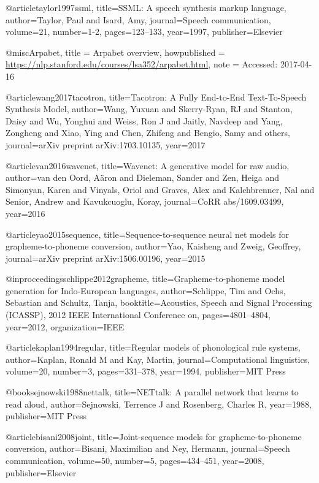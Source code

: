 @article{taylor1997ssml,
  title={SSML: A speech synthesis markup language},
  author={Taylor, Paul and Isard, Amy},
  journal={Speech communication},
  volume={21},
  number={1-2},
  pages={123--133},
  year={1997},
  publisher={Elsevier}
}

@misc{Arpabet,
  title = {Arpabet overview},
  howpublished = {\url{https://nlp.stanford.edu/courses/lsa352/arpabet.html}},
  note = {Accessed: 2017-04-16}
}

@article{wang2017tacotron,
  title={Tacotron: A Fully End-to-End Text-To-Speech Synthesis Model},
  author={Wang, Yuxuan and Skerry-Ryan, RJ and Stanton, Daisy and Wu, Yonghui and Weiss, Ron J and Jaitly, Navdeep and Yang, Zongheng and Xiao, Ying and Chen, Zhifeng and Bengio, Samy and others},
  journal={arXiv preprint arXiv:1703.10135},
  year={2017}
}

@article{van2016wavenet,
  title={Wavenet: A generative model for raw audio},
  author={van den Oord, A{\"a}ron and Dieleman, Sander and Zen, Heiga and Simonyan, Karen and Vinyals, Oriol and Graves, Alex and Kalchbrenner, Nal and Senior, Andrew and Kavukcuoglu, Koray},
  journal={CoRR abs/1609.03499},
  year={2016}
}

@article{yao2015sequence,
  title={Sequence-to-sequence neural net models for grapheme-to-phoneme conversion},
  author={Yao, Kaisheng and Zweig, Geoffrey},
  journal={arXiv preprint arXiv:1506.00196},
  year={2015}
}

@inproceedings{schlippe2012grapheme,
  title={Grapheme-to-phoneme model generation for Indo-European languages},
  author={Schlippe, Tim and Ochs, Sebastian and Schultz, Tanja},
  booktitle={Acoustics, Speech and Signal Processing (ICASSP), 2012 IEEE International Conference on},
  pages={4801--4804},
  year={2012},
  organization={IEEE}
}

@article{kaplan1994regular,
  title={Regular models of phonological rule systems},
  author={Kaplan, Ronald M and Kay, Martin},
  journal={Computational linguistics},
  volume={20},
  number={3},
  pages={331--378},
  year={1994},
  publisher={MIT Press}
}

@book{sejnowski1988nettalk,
  title={NETtalk: A parallel network that learns to read aloud},
  author={Sejnowski, Terrence J and Rosenberg, Charles R},
  year={1988},
  publisher={MIT Press}
}

@article{bisani2008joint,
  title={Joint-sequence models for grapheme-to-phoneme conversion},
  author={Bisani, Maximilian and Ney, Hermann},
  journal={Speech communication},
  volume={50},
  number={5},
  pages={434--451},
  year={2008},
  publisher={Elsevier}
}

